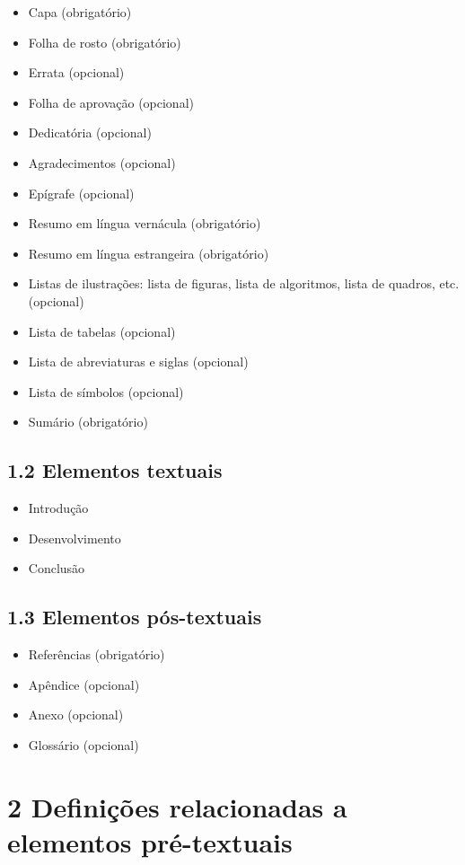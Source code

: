 \documentclass[
	12pt,				%
	oneside,			%
	a4paper,			%
	english,			%
	brazil				%
	]{abntex2ppgsi}
\begin{document}
\begin{anexosenv}
\begin{itemize}
	\item Capa (obrigatório)
	\item	Folha de rosto (obrigatório)
	\item	Errata (opcional)
	\item	Folha de aprovação (opcional)
	\item	Dedicatória (opcional)
	\item	Agradecimentos (opcional)
	\item	Epígrafe (opcional)
	\item	Resumo em língua vernácula (obrigatório)
	\item	Resumo em língua estrangeira (obrigatório)
	\item	Listas de ilustrações: lista de figuras, lista de algoritmos, lista de quadros, etc. (opcional)
	\item	Lista de tabelas (opcional)
	\item	Lista de abreviaturas e siglas (opcional)
	\item	Lista de símbolos (opcional)
	\item	Sumário (obrigatório)
\end{itemize}

\subsection*{1.2 Elementos textuais}

\begin{itemize}
	\item	Introdução
	\item	Desenvolvimento
	\item	Conclusão
\end{itemize}

\subsection*{1.3 Elementos pós-textuais}

\begin{itemize}
	\item	Referências (obrigatório)
	\item	Apêndice (opcional)
	\item	Anexo (opcional)
	\item	Glossário (opcional)
\end{itemize}

\section*{2 Definições relacionadas a elementos pré-textuais}


\end{anexosenv}
\end{document}
